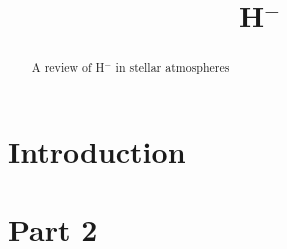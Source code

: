 \documentclass{emulateapj}
\def\h{H$^-$}
\begin{document}
\begin{abstract}
A review of H$^-$ in stellar atmospheres
\end{abstract}

\title{\h}

\section{Introduction}


\section{Part 2}



\end{document}
